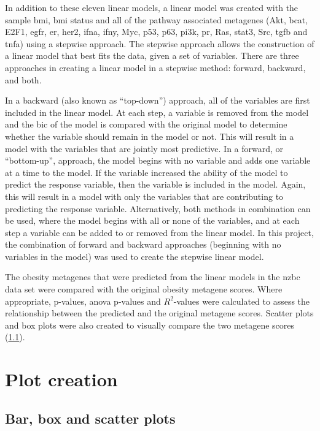 In addition to these eleven linear models, a linear model was created with the sample \gls{bmi}, \gls{bmi} status and all of the pathway associated metagenes (Akt, \gls{bcat}, E2F1, \gls{egfr}, \gls{er}, \gls{her2}, \gls{ifna}, \gls{ifny}, Myc, p53, p63, \gls{pi3k}, \gls{pr}, Ras, \gls{stat3}, Src, \gls{tgfb} and \gls{tnfa}) using a stepwise approach.
The stepwise approach allows the construction of a linear model that best fits the data, given a set of variables.
There are three approaches in creating a linear model in a stepwise method: forward, backward, and both.

In a backward (also known as ``top-down'') approach, all of the variables are first included in the linear model.
At each step, a variable is removed from the model and the \gls{bic} of the model is compared with the original model to determine whether the variable should remain in the model or not.
This will result in a model with the variables that are jointly most predictive.
In a forward, or ``bottom-up'', approach, the model begins with no variable and adds one variable at a time to the model.
If the variable increased the ability of the model to predict the response variable, then the variable is included in the model.
Again, this will result in a model with only the variables that are contributing to predicting the response variable.
Alternatively, both methods in combination can be used, where the model begins with all or none of the variables, and at each step a variable can be added to or removed from the linear model.
In this project, the combination of forward and backward approaches (beginning with no variables in the model) was used to create the stepwise linear model.

The obesity metagenes that were predicted from the linear models in the \gls{nzbc} data set were compared with the original obesity metagene scores.
Where appropriate, p-values, \gls{anova} p-values and  $R^2$-values were calculated to assess the relationship between the predicted and the original metagene scores.
Scatter plots and box plots were also created to visually compare the two metagene scores (\cref{sub:box_and_scatter_plots}).

\section{Plot creation}
\label{sec:plot_creation}

\subsection{Bar, box and scatter plots}
\label{sub:box_and_scatter_plots}

